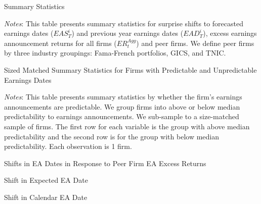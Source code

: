 \newpage \clearpage

\begin{table}[h]
\caption{\label{tab:summary_stats} Summary Statistics}
\vspace{10pt}
\renewcommand{\arraystretch}{1.1}\makebox[\linewidth][c]{

{\small 
}
} \vspace{10pt}

\emph{\footnotesize{}Notes}{\footnotesize{}: This table presents summary statistics for surprise shifts to forecasted earnings dates ($EAS_T^i$) and previous year earnings dates ($EAD_T^i$), excess earnings announcement returns for all firms ($ER^{Agg}_t$) and peer firms. We define peer firms by three industry groupings: Fama-French portfolios, GICS, and TNIC.}{\footnotesize\par}
\end{table}


\newpage
\begin{table}[h]
\caption{\label{tab:summary_stats_predictable_size_matched} Sized Matched Summary Statistics for Firms with Predictable and Unpredictable Earnings Dates}
\vspace{10pt}
\renewcommand{\arraystretch}{0.8}\makebox[\linewidth][c]{

{\small 
}
} \vspace{10pt}

\emph{\footnotesize{}Notes}{\footnotesize{}: This table presents summary statistics by whether the firm's earnings announcements are predictable. We group firms into above or below median predictability to earnings announcements. We sub-sample to a size-matched sample of firms. The first row for each variable is the group with above median predictability and the second row is for the group with below median predictability. Each observation is 1 firm. }{\footnotesize\par}
\end{table}




\begin{table}
\caption{Shifts in EA Dates in Response to Peer Firm EA Excess Returns}
\label{tab:Shifts_Peer_Returns}
\begin{subtable}{\linewidth}
\caption{Shift in Expected EA Date} \label{tab:Shifts_Peer_Returns_a}
\centering
\renewcommand{\arraystretch}{0.8}
\small{}
\end{subtable}

\vspace{20pt}
\begin{subtable}{\linewidth}
\caption{Shift in Calendar EA Date} \label{tab:Shifts_Peer_Returns_b}
\centering
\renewcommand{\arraystretch}{0.8}
\small{}
\end{subtable}
\end{table}



